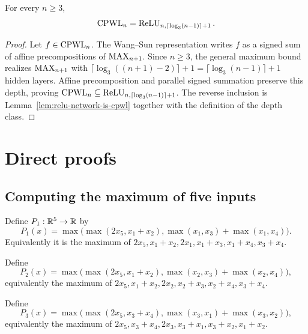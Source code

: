 \begin{theorem}
  \label{thm:main-cpwl}
  For every $n\geq3$,
  \[
    \operatorname{CPWL}_n=\operatorname{ReLU}_{n,\lceil\log_3(n-1)\rceil+1}.
  \]
\end{theorem}
\begin{proof}
  Let $f\in\operatorname{CPWL}_n$.  The Wang--Sun representation writes $f$ as a signed
  sum of affine precompositions of $\operatorname{MAX}_{n+1}$.  Since $n\geq3$, the general
  maximum bound realizes $\operatorname{MAX}_{n+1}$ with
  $\lceil\log_3((n+1)-2)\rceil+1=
  \lceil\log_3(n-1)\rceil+1$ hidden layers.  Affine precomposition and
  parallel signed summation preserve this depth, proving
  $\operatorname{CPWL}_n\subseteq\operatorname{ReLU}_{n,\lceil\log_3(n-1)\rceil+1}$.  The reverse
  inclusion is Lemma~\ref{lem:relu-network-is-cpwl} together with the
  definition of the depth class.
\end{proof}

\chapter{Direct proofs}

\section{Computing the maximum of five inputs}

\begin{definition}
  \label{def:p1}
  Define $P_1:\mathbb{R}^5\to\mathbb{R}$ by
  \[
  P_1(x)=\max\!\bigl(\max(2x_5,x_1+x_2),
               \max(x_1,x_3)+\max(x_1,x_4)\bigr).
  \]
  Equivalently it is the maximum of
  $2x_5,x_1+x_2,2x_1,x_1+x_3,x_1+x_4,x_3+x_4$.
\end{definition}

\begin{definition}
  \label{def:p2}
  Define
  \[
  P_2(x)=\max\!\bigl(\max(2x_5,x_1+x_2),
               \max(x_2,x_3)+\max(x_2,x_4)\bigr),
  \]
  equivalently the maximum of
  $2x_5,x_1+x_2,2x_2,x_2+x_3,x_2+x_4,x_3+x_4$.
\end{definition}

\begin{definition}
  \label{def:p3}
  Define
  \[
  P_3(x)=\max\!\bigl(\max(2x_5,x_3+x_4),
               \max(x_3,x_1)+\max(x_3,x_2)\bigr),
  \]
  equivalently the maximum of
  $2x_5,x_3+x_4,2x_3,x_3+x_1,x_3+x_2,x_1+x_2$.
\end{definition}


